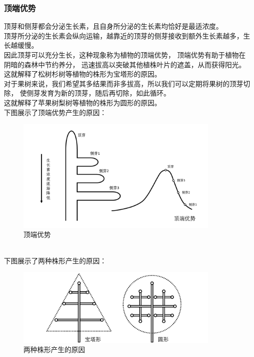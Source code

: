 \documentclass[UTF8]{ctexart}
\begin{document}
\newpage

\subsubsection{顶端优势}
    顶芽和侧芽都会分泌生长素，且自身所分泌的生长素均恰好是最适浓度。\\[3mm]
    顶芽所分泌的生长素会纵向运输，越靠近的顶芽的侧芽接收到额外生长素越多，生长越缓慢。\\[3mm]
    因此顶芽可以充分生长，这种现象称为植物的顶端优势，
    顶端优势有助于植物在阴暗的森林中节约养分，
    迅速拔高以突破其他植株叶片的遮盖，从而获得阳光。\\[3mm]
    这就解释了松树杉树等植物的株形为宝塔形的原因。\\[6mm]
    对于果树来说，我们希望其多结果而非多拔高，所以我们可以定期将果树的顶芽切除，
    使侧芽发育为新的顶芽，随后再切除，如此循环。\\[3mm]
    这就解释了苹果树梨树等植物的株形为圆形的原因。\\[6mm]
    下图展示了顶端优势产生的原因：
    \begin{figure}[h!]
        \begin{center}
            \includegraphics[width=10cm]{BiologyImage/21.jpg}
            \caption{顶端优势}
        \end{center}
    \end{figure}\\
    下图展示了两种株形产生的原因：\vspace{5pt}
    \begin{figure}[h!]
        \begin{center}
            \includegraphics[width=10cm]{BiologyImage/22.jpg}
            \vspace{5pt}
            \caption{两种株形产生的原因}
        \end{center}
    \end{figure}
\end{document}
